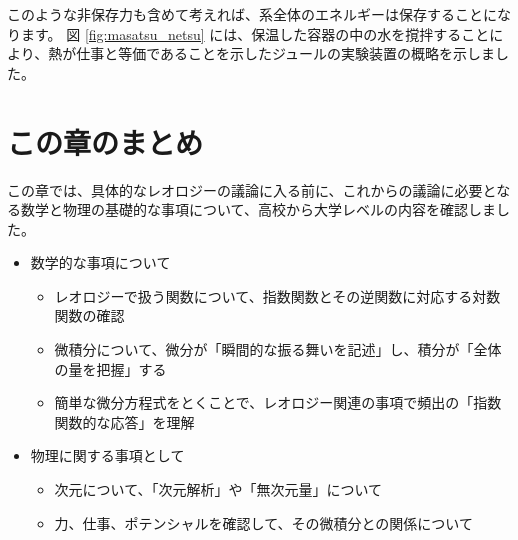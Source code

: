 \documentclass[uplatex,dvipdfmx,a4paper,11pt]{jsarticle}
\begin{document}
このような非保存力も含めて考えれば、系全体のエネルギーは保存することになります。
図 \ref{fig:masatsu_netsu} には、保温した容器の中の水を撹拌することにより、熱が仕事と等価であることを示したジュールの実験装置の概略を示しました。

\section*{この章のまとめ}

この章では、具体的なレオロジーの議論に入る前に、これからの議論に必要となる数学と物理の基礎的な事項について、高校から大学レベルの内容を確認しました。
\begin{boxnote}
	\large
	\begin{itemize}
		\item 数学的な事項について
			\begin{itemize}
				\item レオロジーで扱う関数について、指数関数とその逆関数に対応する対数関数の確認
				\item 微積分について、微分が「瞬間的な振る舞いを記述」し、積分が「全体の量を把握」する
				\item 簡単な微分方程式をとくことで、レオロジー関連の事項で頻出の「指数関数的な応答」を理解
			\end{itemize}
		\item 物理に関する事項として
			\begin{itemize}
				\item 次元について、「次元解析」や「無次元量」について
				\item 力、仕事、ポテンシャルを確認して、その微積分との関係について
			\end{itemize}
	\end{itemize}
\end{boxnote}

\newpage
\end{document}
